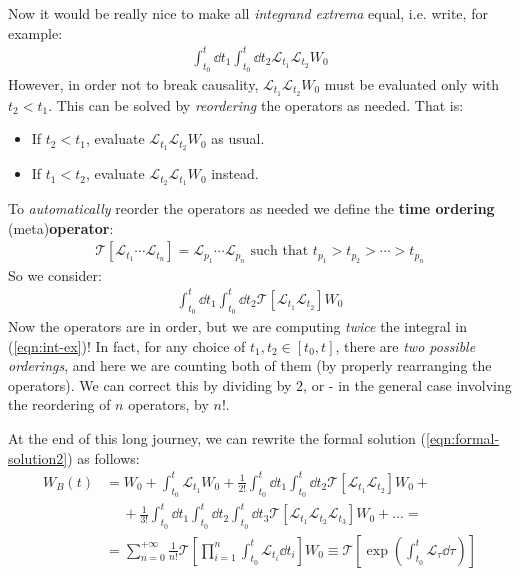 \documentclass[../template.tex]{subfiles}
\begin{document}
\begin{exo}
\begin{enumerate}
        Now it would be really nice to make all \textit{integrand extrema} equal, i.e. write, for example:
        \begin{align*}
            \int_{t_0}^t \dd{t_1} \int_{t_0}^t \dd{t_2} \mathcal{L}_{t_1} \mathcal{L}_{t_2} W_0
        \end{align*} 
        However, in order not to break causality, $\mathcal{L}_{t_1} \mathcal{L}_{t_2} W_0$ must be evaluated only with $t_2 < t_1$. This can be solved by \textit{reordering} the operators as needed. That is:
        \begin{itemize}
            \item If $t_2 < t_1$, evaluate $\mathcal{L}_{t_1} \mathcal{L}_{t_2} W_0$ as usual.
            \item If $t_1 < t_2$, evaluate $\mathcal{L}_{t_2} \mathcal{L}_{t_1} W_0$ instead.
        \end{itemize}
        To \textit{automatically} reorder the operators as needed we define the \textbf{time ordering} (meta)\textbf{operator}:
        \begin{align*}
            \mathcal{T}[\mathcal{L}_{t_1}\cdots \mathcal{L}_{t_n}] = \mathcal{L}_{p_1} \cdots \mathcal{L}_{p_n} \text{ such that } t_{p_1} > t_{p_2} > \cdots > t_{p_n}
        \end{align*}   
        So we consider:
        \begin{align*}
            \int_{t_0}^t \dd{t_1} \int_{t_0}^{t} \dd{t_2} \mathcal{T}[\mathcal{L}_{t_1} \mathcal{L}_{t_2}] W_0 
        \end{align*}
        Now the operators are in order, but we are computing \textit{twice} the integral in (\ref{eqn:int-ex})! In fact, for any choice of $t_1, t_2 \in [t_0,t]$, there are \textit{two possible orderings}, and here we are counting both of them (by properly rearranging the operators). We can correct this by dividing by $2$, or - in the general case involving the reordering of $n$ operators, by $n!$.
         
        \medskip

        At the end of this long journey, we can rewrite the formal solution (\ref{eqn:formal-solution2}) as follows:
        \begin{align} \label{eqn:formal-solution3}
            W_B(t)  &= W_0 + \int_{t_0}^t \mathcal{L}_{t_1} W_0 + \frac{1}{2!} \int_{t_0}^{t} \dd{t_1} \int_{t_0}^t \dd{t_2} \mathcal{T}[\mathcal{L}_{t_1} \mathcal{L}_{t_2}] W_0 +\\ \nonumber
            &\quad\> + \frac{1}{3!} \int_{t_0}^t \dd{t_1} \int_{t_0}^t \dd{t_2} \int_{t_0}^t \dd{t_3} \mathcal{T}[\mathcal{L}_{t_1} \mathcal{L}_{t_2} \mathcal{L}_{t_3}]  W_0 + \dots =\\
            &= \sum_{n=0}^{+\infty} \frac{1}{n!} \mathcal{T}\left[\prod_{i=1}^n \int_{t_0}^t \mathcal{L}_{t_i} \dd{t_i}\right] W_0 \equiv  \mathcal{T}\left[\exp\left(\int_{t_0}^t \mathcal{L}_\tau \dd{\tau}\right)\right]
        \end{align}
       

\end{enumerate}
\end{exo}
\end{document}
